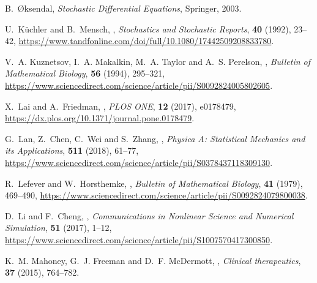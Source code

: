 \documentclass{aims}
\theoremstyle{definition}
\begin{document}
\begin{thebibliography}{10}
\newblock B.~{\O}ksendal,
\newblock \emph{{Stochastic Differential Equations}}, 
\newblock Springer, 2003.

\newblock U.~K{\"{u}}chler and B.~Mensch,
,
\newblock \emph{Stochastics and Stochastic Reports}, \textbf{40} (1992),
  23--42,
\newblock
  \urlprefix\url{https://www.tandfonline.com/doi/full/10.1080/17442509208833780}.

\newblock V.~A. Kuznetsov, I.~A. Makalkin, M.~A. Taylor and A.~S. Perelson,
,
\newblock \emph{Bulletin of Mathematical Biology}, \textbf{56} (1994),
  295--321,
\newblock
  \urlprefix\url{https://www.sciencedirect.com/science/article/pii/S0092824005802605}.

\newblock X.~Lai and A.~Friedman,
,
\newblock \emph{PLOS ONE}, \textbf{12} (2017), e0178479,
\newblock \urlprefix\url{https://dx.plos.org/10.1371/journal.pone.0178479}.

\newblock G.~Lan, Z.~Chen, C.~Wei and S.~Zhang,
,
\newblock \emph{Physica A: Statistical Mechanics and its Applications},
  \textbf{511} (2018), 61--77,
\newblock
  \urlprefix\url{https://www.sciencedirect.com/science/article/pii/S0378437118309130}.

\newblock R.~Lefever and W.~Horsthemke,
,
\newblock \emph{Bulletin of Mathematical Biology}, \textbf{41} (1979),
  469--490,
\newblock
  \urlprefix\url{https://www.sciencedirect.com/science/article/pii/S0092824079800038}.

\newblock D.~Li and F.~Cheng,
,
\newblock \emph{Communications in Nonlinear Science and Numerical Simulation},
  \textbf{51} (2017), 1--12,
\newblock
  \urlprefix\url{https://www.sciencedirect.com/science/article/pii/S1007570417300850}.

\newblock K.~M. Mahoney, G.~J. Freeman and D.~F. McDermott,
,
\newblock \emph{Clinical therapeutics}, \textbf{37} (2015), 764--782.


\end{thebibliography}
\end{document}
